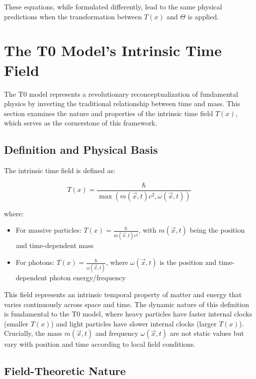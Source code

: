 \documentclass[12pt,a4paper]{article}
\newcommand{\Tfield}{T(x)}
\newcommand{\vecx}{\vec{x}}
\begin{document}
	These equations, while formulated differently, lead to the same physical predictions when the transformation between \(\Tfield\) and \(\Theta\) is applied.
	
	\section{The T0 Model's Intrinsic Time Field}
	\label{sec:t0_time_field}
	
	The T0 model represents a revolutionary reconceptualization of fundamental physics by inverting the traditional relationship between time and mass. This section examines the nature and properties of the intrinsic time field \(\Tfield\), which serves as the cornerstone of this framework.
	
	\subsection{Definition and Physical Basis}
	\label{subsec:time_field_definition}
	
	The intrinsic time field is defined as:
	
	\begin{equation}
		\Tfield = \frac{\hbar}{\max(m(\vecx,t)c^2, \omega(\vecx,t))}
	\end{equation}
	
	where:
	\begin{itemize}
		\item For massive particles: \(\Tfield = \frac{\hbar}{m(\vecx,t)c^2}\), with \(m(\vecx,t)\) being the position and time-dependent mass
		\item For photons: \(\Tfield = \frac{\hbar}{\omega(\vecx,t)}\), where \(\omega(\vecx,t)\) is the position and time-dependent photon energy/frequency
	\end{itemize}
	
	This field represents an intrinsic temporal property of matter and energy that varies continuously across space and time. The dynamic nature of this definition is fundamental to the T0 model, where heavy particles have faster internal clocks (smaller \(\Tfield\)) and light particles have slower internal clocks (larger \(\Tfield\)). Crucially, the mass \(m(\vecx,t)\) and frequency \(\omega(\vecx,t)\) are not static values but vary with position and time according to local field conditions.
	
	\subsection{Field-Theoretic Nature}
	\label{subsec:field_theoretic_nature}
	
\end{document}

